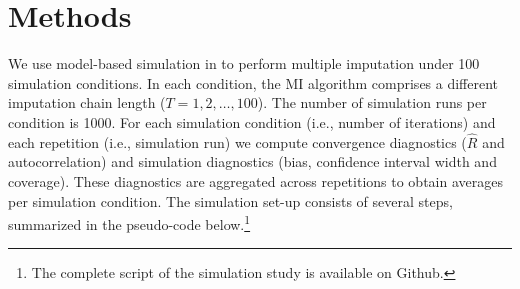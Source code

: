 \documentclass[article]{jss}
\begin{document}
% 
% 



\section{Methods} \label{sec:methods}

We use model-based simulation in  to perform multiple imputation under 100 simulation conditions. In each condition, the MI algorithm comprises a different imputation chain length ($T = 1, 2, \dots, 100$). The number of simulation runs per condition is 1000. For each simulation condition (i.e., number of iterations) and each repetition (i.e., simulation run) we compute convergence diagnostics ($\widehat{R}$ and autocorrelation) and simulation diagnostics (bias, confidence interval width and coverage). These diagnostics are aggregated across repetitions to obtain averages per simulation condition.
The simulation set-up consists of several steps, summarized in the pseudo-code below.\footnote{The complete  script of the simulation study is available on Github.}
\end{document}
